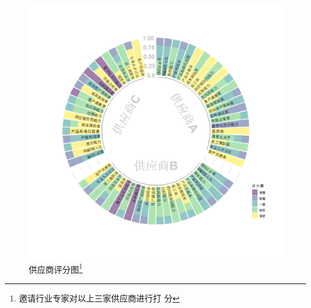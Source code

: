 \documentclass{beamer}
\begin{document}
\begin{frame}
	\begin{figure}[h]
		\centering
		\includegraphics[height=0.8\textheight,trim=100 100 50 80,clip]{pic/supply.png}
		\caption{供应商评分图\footnote{邀请行业专家对以上三家供应商进行打
				分}}
		\label{supply}
	\end{figure}
\end{frame}
\end{document}
